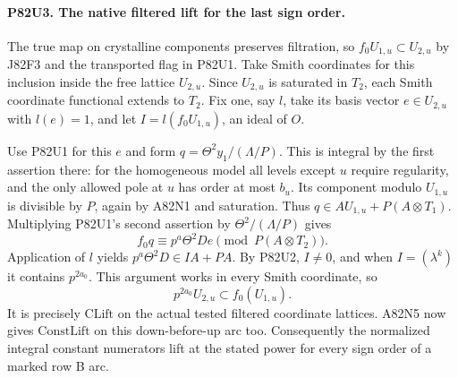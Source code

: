 \paragraph{P82U3. The native filtered lift for the last sign order.}
The true map on crystalline components preserves filtration, so
$f_0 U_{1,u}\subset U_{2,u}$ by J82F3 and the transported flag
in P82U1. Take Smith coordinates for this inclusion inside the
free lattice $U_{2,u}$. Since $U_{2,u}$ is saturated in $T_2$,
each Smith coordinate functional extends to $T_2$. Fix one, say
$l$, take its basis vector $e\in U_{2,u}$ with $l(e)=1$,
and let $I=l(f_0 U_{1,u})$, an ideal of $O$.

Use P82U1 for this $e$ and form $q=\Theta^2 y_1/(\Lambda/P)$.
This is integral by the first assertion there: for the
homogeneous model all levels except $u$ require regularity,
and the only allowed pole at $u$ has order at most $b_u$.
Its component modulo $U_{1,u}$ is divisible by $P$, again by
A82N1 and saturation. Thus $q\in A U_{1,u}+P(A\otimes T_1)$.
Multiplying P82U1's second assertion by $\Theta^2/(\Lambda/P)$
gives
\[
            f_0 q\equiv p^a\Theta^2D e\pmod{P(A\otimes T_2)} .
\]
Application of $l$ yields $p^a\Theta^2 D\in IA+PA$.
By P82U2, $I\ne0$, and when $I=(\lambda^k)$ it contains
$p^{2a_0}$. This argument works in every Smith coordinate, so
\[
                p^{2a_0}U_{2,u}\subset f_0(U_{1,u}).
\]
It is precisely $\mathrm{CLift}$ on the actual tested filtered
coordinate lattices. A82N5 now gives $\mathrm{ConstLift}$ on
this down-before-up arc too. Consequently the normalized integral
constant numerators lift at the stated power for every sign
order of a marked row B arc.
